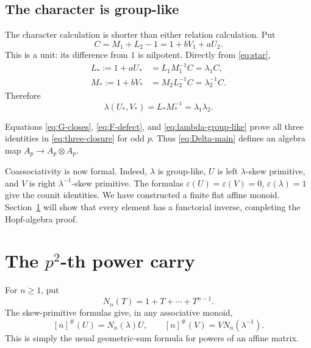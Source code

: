\documentclass[11pt]{amsart}
\theoremstyle{definition}
\theoremstyle{remark}
\newcommand{\ot}{\otimes}
\begin{document}
\subsection{The character is group-like}

The character calculation is shorter than either relation calculation.
Put
\begin{equation}\label{eq:C}
 C=M_1+L_2-1=1+bV_1+aU_2.
\end{equation}
This is a unit: its difference from \(1\) is nilpotent.  Directly from
\eqref{eq:star},
\begin{align}
 L_*:=1+aU_*
 &=L_1M_1^{-1}C=\lambda_1C,\label{eq:Lstar}\\
 M_*:=1+bV_*
 &=M_2L_2^{-1}C=\lambda_2^{-1}C.\label{eq:Mstar}
\end{align}
Therefore
\begin{equation}\label{eq:lambda-group-like}
 \lambda(U_*,V_*)=L_*M_*^{-1}
 =\lambda_1\lambda_2.
\end{equation}

Equations \eqref{eq:G-closes}, \eqref{eq:F-defect}, and
\eqref{eq:lambda-group-like} prove all three identities in
\eqref{eq:three-closure} for odd \(p\).  Thus \eqref{eq:Delta-main}
defines an algebra map \(A_p\to A_p\ot A_p\).

Coassociativity is now formal.  Indeed, \(\lambda\) is group-like, \(U\)
is left \(\lambda\)-skew primitive, and \(V\) is right
\(\lambda^{-1}\)-skew primitive.  The formulas
\(\varepsilon(U)=\varepsilon(V)=0\), \(\varepsilon(\lambda)=1\) give
the counit identities.  We have constructed a finite flat affine monoid.
Section~\ref{sec:powers} will show that every element has a functorial
inverse, completing the Hopf-algebra proof.

\section{The \texorpdfstring{\(p^2\)}{p-squared}-th power carry}
\label{sec:powers}

For \(n\geq1\), put
\begin{equation}\label{eq:norm}
 N_n(T)=1+T+\cdots+T^{n-1}.
\end{equation}
The skew-primitive formulas give, in any associative monoid,
\begin{equation}\label{eq:power-skew}
 [n]^\#(U)=N_n(\lambda)U,
 \qquad
 [n]^\#(V)=V N_n(\lambda^{-1}).
\end{equation}
This is simply the usual geometric-sum formula for powers of an affine
matrix.
\end{document}
